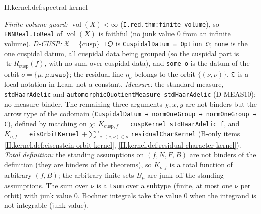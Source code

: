 \begin{definition}
\end{definition}
\begin{tfformal}{II.kernel.def:spectral-kernel}
\begin{tffidelity}
\emph{Finite volume guard:} $\operatorname{vol}(X)<\infty$ (\texttt{I.red.thm:finite-volume}), so \texttt{ENNReal.toReal} of $\operatorname{vol}(X)$ is faithful (no junk value $0$ from an infinite volume).
\emph{D-CUSP:} $\mathfrak X=\{\mathrm{cusp}\}\sqcup\mathfrak O$ is \texttt{CuspidalDatum = Option 𝔒}; \texttt{none} is the one cuspidal datum, all cuspidal data being grouped (so the cuspidal part is $\operatorname{tr}R_{\mathrm{cusp}}(f)$, with no sum over cuspidal data), and \texttt{some o} is the datum of the orbit $o=\{\mu,\mu.\texttt{swap}\}$; the residual line $\eta_\nu$ belongs to the orbit $\{(\nu,\nu)\}$. \texttt{𝔒} is a local notation in Lean, not a constant. \emph{Measure:} the standard measure, \texttt{stdHaarAdelic} and \texttt{automorphicQuotientMeasure stdHaarAdelic} (D-MEAS10); no measure binder. The remaining three arguments $\chi,x,y$ are not binders but the arrow type of the codomain (\texttt{CuspidalDatum → normOneGroup → normOneGroup → ℂ}), defined by matching on $\chi$: $K_{\mathrm{cusp},f}=$ \texttt{cuspKernel stdHaarAdelic f}, and $K_{o,f}=$ \texttt{eisOrbitKernel} $+\sum'_{\nu:(\nu,\nu)\in o}$ \texttt{residualCharKernel} (B-only items \cref{II.kernel.def:eisenstein-orbit-kernel}, \cref{II.kernel.def:residual-character-kernel}). \emph{Total definition:} the standing assumptions on $(f,N,F,B)$ are not binders of the definition (they are binders of the theorems), so $K_{o,f}$ is a total function of arbitrary $(f,B)$; the arbitrary finite sets $B_\mu$ are junk off the standing assumptions. The sum over $\nu$ is a \texttt{tsum} over a subtype (finite, at most one $\nu$ per orbit) with junk value $0$. Bochner integrals take the value $0$ when the integrand is not integrable (junk value). 

\end{tffidelity}
\end{tfformal}
